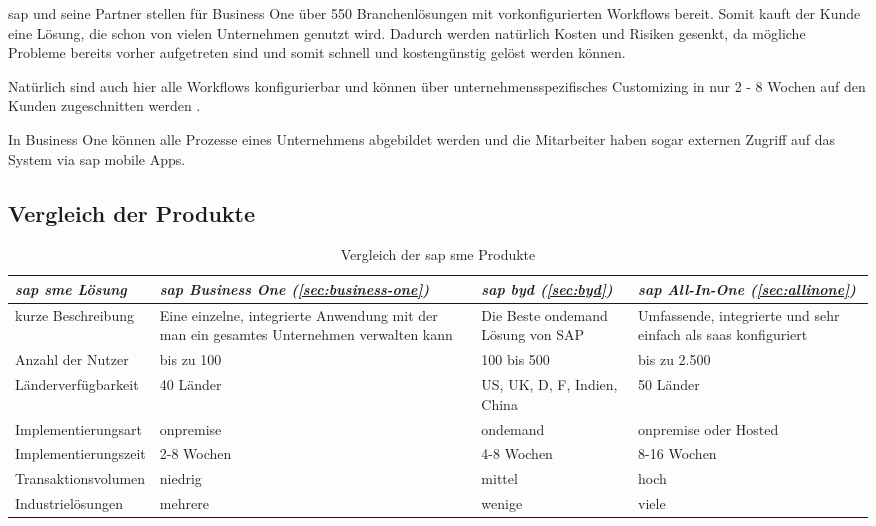 \gls{sap} und seine Partner stellen für Business One über 550 Branchenlösungen mit vorkonfigurierten Workflows bereit. Somit kauft der Kunde eine Lösung, die schon von vielen Unternehmen genutzt wird. Dadurch werden natürlich Kosten und Risiken gesenkt, da mögliche Probleme bereits vorher aufgetreten sind und somit schnell und kostengünstig gelöst werden können.

Natürlich sind auch hier alle Workflows konfigurierbar und können über unternehmensspezifisches Customizing in nur 2 - 8 Wochen auf den Kunden zugeschnitten werden \cite{BusinessOne}.

In Business One können alle Prozesse eines Unternehmens abgebildet werden und die Mitarbeiter haben sogar externen Zugriff auf das System via \gls{sap} mobile Apps.

\subsection{Vergleich der Produkte}
\begin{table}[H]
\begin{center}
\begin{tabular}{p{3.8cm}||p{3cm}|p{3cm}|p{3cm}}
  \emph{\gls{sap} \gls{sme} Lösung} & \emph{\gls{sap} Business One (\ref{sec:business-one})} & \emph{\gls{sap} \gls{byd} (\ref{sec:byd})} & \emph{\gls{sap} All-In-One (\ref{sec:allinone})}\\	
  \hline
  kurze Beschreibung & Eine einzelne, integrierte Anwendung mit der man ein gesamtes Unternehmen verwalten kann & Die Beste \gls{ondemand} Lösung von SAP & Umfassende, integrierte und sehr einfach als \gls{saas} konfiguriert\\
  \hline
  Anzahl der Nutzer & bis zu 100 & 100 bis 500 &  bis zu 2.500\\
  \hline
  Länderverfügbarkeit & 40 Länder & US, UK, D, F, Indien, China & 50 Länder\\
  \hline	
  Implementierungsart & \gls{onpremise} & \gls{ondemand} & \gls{onpremise} oder Hosted\\
  \hline	
  Implementierungszeit & 2-8 Wochen & 4-8 Wochen & 8-16 Wochen\\
  \hline	
  Transaktionsvolumen & niedrig & mittel & hoch\\
  \hline	
  Industrielösungen & mehrere & wenige & viele\\
  \hline				
\end{tabular}
\end{center}
\caption{Vergleich der \gls{sap} \gls{sme} Produkte} 
\label{tab:smevergleich}
\end{table}

